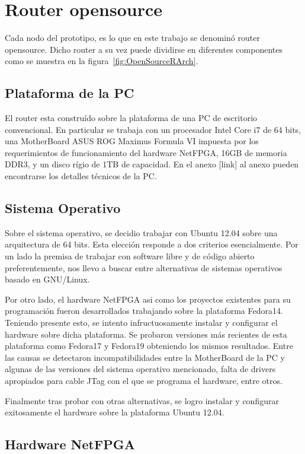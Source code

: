 \section{Router opensource}

Cada nodo del prototipo, es lo que en este trabajo se denomin\'o router opensource. Dicho router a su vez puede dividirse en diferentes componentes como se muestra en la figura~\ref{fig:OpenSourceRArch}.

\subsection{Plataforma de la PC}
El router esta constru\'ido sobre la plataforma de una PC de escritorio convencional. En particular se trabaja con un procesador Intel Core i7 de 64 bits, una MotherBoard ASUS ROG Maximus Formula VI impuesta por los requerimientos de funcionamiento del hardware NetFPGA, 16GB de memoria DDR3, y un disco r\'igio de 1TB de capacidad. En el anexo [link] al anexo pueden encontrarse los detalles t\'ecnicos de la PC.

\subsection{Sistema Operativo}
Sobre el sistema operativo, se decidio trabajar con Ubuntu 12.04 sobre una arquitectura de 64 bits. Esta elecci\'on responde a dos criterios esencialmente. Por un lado la premisa de trabajar con software libre y de c\'odigo abierto preferentemente, nos llevo a buscar entre alternativas de sistemas operativos basado en GNU/Linux.

Por otro lado, el hardware NetFPGA asi como los proyectos existentes para su programaci\'on fueron desarrollados trabajando sobre la plataforma Fedora14. Teniendo presente esto, se intento infructuosamente instalar y configurar el hardware sobre dicha plataforma. Se probaron versiones m\'as recientes de esta plataforma como Fedora17 y Fedora19 obteniendo los mismos resultados. Entre las causas se detectaron incompatibilidades entre la MotherBoard de la PC y algunas de las versiones del sistema operativo mencionado, falta de drivers apropiados para cable JTag con el que se programa el hardware, entre otros.

Finalmente tras probar con otras alternativas, se logro instalar y configurar exitosamente el hardware sobre la plataforma Ubuntu 12.04.\\

\subsection{Hardware NetFPGA}

